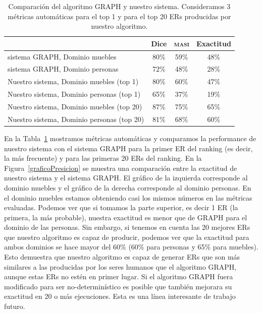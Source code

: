 \begin{table}[h]
\begin{center}
\begin{tabular}{|l|c|c|c|}
\hline
	 	& 	Dice		&	\textsc{masi}	&	Exactitud		\\
\hline
sistema GRAPH, Dominio muebles	& 	80\% 		&	59\%	&	48\%		 	\\
sistema GRAPH, Dominio personas 	& 	72\%		&	48\%	&	28\%			\\
\hline
Nuestro sistema, Dominio muebles (top 1)	&	80\%		&	60\%	&	47\%		\\
Nuestro sistema, Dominio personas (top 1)	&	65\%		&	37\%	&	19\%		\\
\hline
Nuestro sistema, Dominio muebles (top 20)&	87\%		&	75\%  	&	65\%		\\
Nuestro sistema, Dominio personas (top 20)   &	81\%		&68\%	&	60\%		\\
\hline
\end{tabular}
\caption{Comparaci\'on del algoritmo GRAPH y nuestro sistema. Consideramos 3 m\'etricas autom\'aticas para el top 1 y para el top 20 ERs producidas por nuestro algoritmo.}
\label{Tabla_sis_1_20}
\end{center}
\end{table}

En la Tabla~\ref{Tabla_sis_1_20} mostramos m\'etricas autom\'aticas y comparamos la performance de nuestro sistema con el sistema GRAPH para la primer ER del ranking (es decir, la m\'as frecuente) y para las primeras 20 ERs del ranking.
En la Figura~\ref{graficoPresicion} se muestra una comparaci\'on entre la exactitud de nuestro sistema y el sistema GRAPH. El gr\'afico de la izquierda corresponde al dominio muebles y el gr\'afico de la derecha corresponde al dominio personas. En el dominio muebles estamos obteniendo casi los mismos n\'umeros en las m\'etricas evaluadas.
Podemos ver que si tomamos la parte superior, es decir 1 ER (la primera, la m\'as probable), nuestra exactitud es menor que de GRAPH para el dominio de las personas. Sin embargo, si tenemos en cuenta las 20 mejores ERs que nuestro algoritmo es capaz de producir, podemos ver que la exactitud para ambos dominios se hace mayor del 60\% (60\% para personas y 65\% para muebles). Esto demuestra que nuestro algoritmo es capaz de generar ERs que son m\'as similares a las producidas por los seres humanos que el algoritmo GRAPH, aunque estas ERs no est\'en en primer lugar. Si el algoritmo GRAPH fuera modificado para ser no-determin\'istico es posible que tambi\'en mejorara su exactitud en 20 o m\'as ejecuciones. Esta es una l\'inea interesante de trabajo futuro. 


